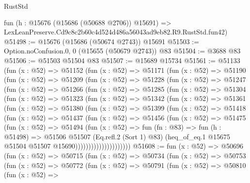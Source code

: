 \begin{lexlean}{RustStd}
\begin{coremodule}
    fun (h : @15676 (@15686 (@50688 @2706)) @15691) =>
    LexLeanPreserve.Cd9c8c2b60c4d524d486a56043ad9eb82.R9.RustStd.fun42)
@51498 := @15676 (@15686 (@50674 @2743)) @15691
@51503 := Option.noConfusion.{0, 0} (@15655 (@50679 @2743)) @83
@51504 := @3688 @83
@51506 := @51503 @51504 @83
@51507 := @15689 @15734
@51561 := @51133
    (fun (x : @52) =>
    @51152
      (fun (x : @52) =>
      @51171
        (fun (x : @52) =>
        @51190
          (fun (x : @52) =>
          @51209
            (fun (x : @52) =>
            @51228
              (fun (x : @52) =>
              @51247
                (fun (x : @52) =>
                @51266
                  (fun (x : @52) =>
                  @51285
                    (fun (x : @52) =>
                    @51304
                      (fun (x : @52) =>
                      @51323
                        (fun (x : @52) =>
                        @51342
                          (fun (x : @52) =>
                          @51361
                            (fun (x : @52) =>
                            @51380
                              (fun (x : @52) =>
                              @51399
                                (fun (x : @52) =>
                                @51418
                                  (fun (x : @52) =>
                                  @51437
                                    (fun (x : @52) =>
                                    @51456
                                      (fun (x : @52) =>
                                      @51475
                                        (fun (x : @52) =>
                                        @51494
                                          (fun (x : @52) =>
                                          fun (fn : @83) =>
                                          fun (h : @51498) =>
                                          @51506
                                            @51507
                                            (Eq.refl.{2} (Sort 1) @83)
                                            (heq_of_eq.{1}
                                              @15675
                                              @51504
                                              @51507
                                              @15690)))))))))))))))))))))
@51608 := fun (x : @52) =>
  @50696
    (fun (x : @52) =>
    @50715
      (fun (x : @52) =>
      @50734
        (fun (x : @52) =>
        @50753
          (fun (x : @52) =>
          @50772
            (fun (x : @52) =>
            @50791
              (fun (x : @52) =>
              @50810
                (fun (x : @52) =>

\end{coremodule}
\end{lexlean}
